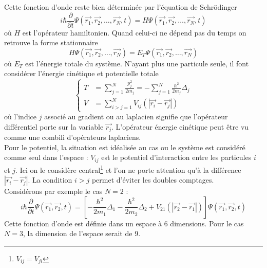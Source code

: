 \documentclass[british,french,11pt, a4paper, openany]{book}
\begin{document}
Cette fonction d'onde reste bien déterminée par l'équation de Schrödinger 
\begin{equation}
	i\hbar\frac{\partial}{\partial t} \Psi(\vec{r_1}, \vec{r_2}, \dots, \vec{r_N}, t) = H \Psi(\vec{r_1}, \vec{r_2}, \dots, \vec{r_N}, t)
\end{equation}
où $H$ est l'opérateur hamiltonien. Quand celui-ci ne dépend pas du temps on retrouve la forme stationnaire
\begin{equation}
	H\Psi(\vec{r_1}, \vec{r_2}, \dots, \vec{r_N}) = E_T\Psi(\vec{r_1}, \vec{r_2}, \dots, \vec{r_N})
\end{equation}
où $E_T$ est l'énergie totale du système. N'ayant plus une particule seule, il font considérer l'énergie cinétique et potentielle totale
\begin{equation}
	\left\{\begin{array}{ll}
		T &= \sum_{j=1}^N \frac{p_j^2}{2m_j} = - \sum_{j=1}^N \frac{\hbar^2}{2m_j}\Delta_j\\
		V &= \sum_{i>j=1}^N V_{ij}(|\vec{r_i}-\vec{r_j}|)
	\end{array}\right.
\end{equation}
où l'indice $j$ associé au gradient ou au laplacien signifie que l'opérateur différentiel porte sur la variable $\vec{r_j}$. L'opérateur énergie cinétique peut être vu comme une combili d'opérateurs laplaciens.\\
Pour le potentiel, la situation est idéalisée au cas ou le système est considéré comme seul dans l'espace : $V_{ij}$ est le potentiel d'interaction entre les particules $i$ et $j$. Ici on le considère central\footnote{$V_{ij} = V_{ji}$} et l'on ne porte attention qu'à la différence $|\vec{r_i}-\vec{r_j}|$. La condition $i>j$ permet d'éviter les doubles comptages.\\

Considérons par exemple le cas $N=2$ :
\begin{equation}
	i\hbar\frac{\partial}{\partial t}\Psi(\vec{r_1}, \vec{r_2},t) = \left[-\frac{\hbar^2}{2m_1}\Delta_1 - \frac{\hbar^2}{2m_2}\Delta_2 + V_{21}(|\vec{r_2}-\vec{r_1}|) \right]\Psi(\vec{r_1}, \vec{r_2},t)
\end{equation}
Cette fonction d'onde est définie dans un espace à 6 dimensions. Pour le cas $N=3$, la dimension de l'espace serait de 9.
\end{document}
